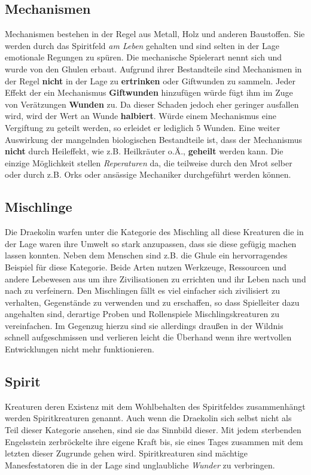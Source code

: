\subsection*{Mechanismen} \label{mechanismus}
Mechanismen bestehen in der Regel aus Metall, Holz und anderen Baustoffen. Sie werden durch das Spiritfeld \textit{am Leben} gehalten und sind selten in der Lage emotionale Regungen zu spüren. Die mechanische Spielerart nennt sich \textit{} und wurde von den Ghulen erbaut. Aufgrund ihrer Bestandteile sind Mechanismen in der Regel \textbf{nicht} in der Lage zu \textbf{ertrinken} oder Giftwunden zu sammeln. Jeder Effekt der ein Mechanismus \textbf{Giftwunden} hinzufügen würde fügt ihm im Zuge von Verätzungen \textbf{Wunden} zu. Da dieser Schaden jedoch eher geringer ausfallen wird, wird der Wert an Wunde \textbf{halbiert}. Würde einem Mechanismus eine Vergiftung zu geteilt werden, so erleidet er lediglich 5 Wunden. Eine weiter Auswirkung der mangelnden biologischen Bestandteile ist, dass der Mechanismus \textbf{nicht} durch Heileffekt, wie z.B. Heilkräuter o.Ä., \textbf{geheilt} werden kann. Die einzige Möglichkeit stellen \textit{Reperaturen} da, die teilweise durch den Mrot selber oder durch z.B. Orks oder ansässige Mechaniker durchgeführt werden können.

\subsection*{Mischlinge}
Die Draekolin warfen unter die Kategorie des Mischling all diese Kreaturen die in der Lage waren ihre Umwelt so stark anzupassen, dass sie diese gefügig machen lassen konnten. Neben dem Menschen sind z.B. die Ghule ein hervorragendes Beispiel für diese Kategorie. Beide Arten nutzen Werkzeuge, Ressourcen und andere Lebewesen aus um ihre Zivilisationen zu errichten und ihr Leben nach und nach zu verfeinern. Den Mischlingen fällt es viel einfacher sich zivilisiert zu verhalten, Gegenstände zu verwenden und zu erschaffen, so dass Spielleiter dazu angehalten sind, derartige Proben und Rollenspiele Mischlingskreaturen zu vereinfachen. Im Gegenzug hierzu sind sie allerdings draußen in der Wildnis schnell aufgeschmissen und verlieren leicht die Überhand wenn ihre wertvollen Entwicklungen nicht mehr funktionieren.

\subsection*{Spirit}
Kreaturen deren Existenz mit dem Wohlbehalten des Spiritfeldes zusammenhängt werden Spiritkreaturen genannt. Auch wenn die Draekolin sich selbst nicht als Teil dieser Kategorie ansehen, sind sie das Sinnbild dieser. Mit jedem sterbenden Engelsstein zerbröckelte ihre eigene Kraft bis, sie eines Tages zusammen mit dem letzten dieser Zugrunde gehen wird. Spiritkreaturen sind mächtige Manesfestatoren die in der Lage sind unglaubliche \textit{Wunder} zu verbringen.

